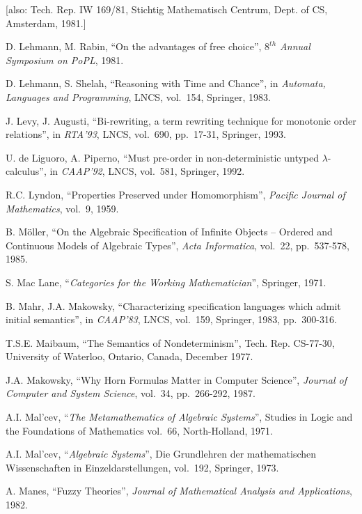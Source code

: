 {\small{[also: Tech.  Rep.  IW 169/81, 
Stichtig Mathematisch Centrum, Dept.  of CS, Amsterdam, 1981.]}\normalsize}

 D. Lehmann, M. Rabin, ``On the advantages of free 
choice'', {\em $8^{th}$ Annual Symposium on PoPL}, 1981.

 D. Lehmann, S. Shelah, ``Reasoning with Time and 
Chance'', in {\em Automata, Languages and Programming}, LNCS, vol.~154, 
Springer, 1983.

 J. Levy, J. Augusti, ``Bi-rewriting, a term rewriting 
technique for monotonic order relations'', in {\em RTA'93}, LNCS, vol.~690,  
pp.~17-31, Springer, 1993.

 U. de Liguoro, A. Piperno, ``Must pre-order in 
non-deterministic untyped $\lambda$-calculus'', in {\em CAAP'92}, LNCS, 
vol.~581, Springer, 1992.

 R.C. Lyndon, ``Properties Preserved under 
Homomorphism'', {\em Pacific Journal of Mathematics}, vol.~9, 1959.

 B. M\"{o}ller, ``On the Algebraic Specification of 
Infinite Objects -- Ordered and Continuous Models of Algebraic Types'', 
{\em Acta Informatica}, vol.~22, pp.~537-578, 1985.

 S. Mac Lane, ``{\em Categories for the Working 
Mathematician}'', Springer, 1971.

 B. Mahr, J.A. Makowsky, ``Characterizing specification 
languages which admit initial semantics'', in {\em CAAP'83}, LNCS, vol.~159, 
Springer, 1983, pp.~300-316.

 T.S.E. Maibaum, ``The Semantics of Nondeterminism'', 
Tech.  Rep.  CS-77-30, University of Waterloo, Ontario, Canada, December 
1977.

 J.A. Makowsky, ``Why Horn Formulas Matter in Computer 
Science'', {\em Journal of Computer and System Science}, vol.~34, pp.~266-292, 
1987.

 A.I. Mal'cev, ``{\em The Metamathematics of Algebraic 
Systems}'', Studies in Logic and the Foundations of Mathematics vol.~66, 
North-Holland, 1971.

 A.I. Mal'cev, ``{\em Algebraic Systems}'', Die 
Grundlehren der mathematischen Wissenschaften in Einzeldarstellungen, vol.~192, Springer, 1973.

 A. Manes, ``Fuzzy Theories'', {\em Journal of 
Mathematical Analysis and Applications}, 1982.

